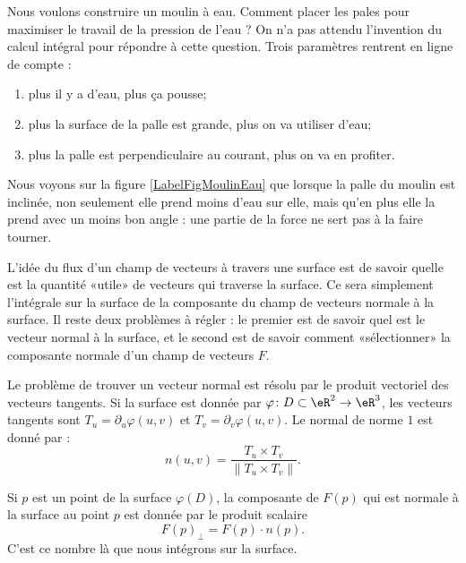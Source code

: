 Nous voulons construire un moulin à eau. Comment placer les pales pour maximiser le travail de la pression de l'eau ? On n'a pas attendu l'invention du calcul intégral pour répondre à cette question. Trois paramètres rentrent en ligne de compte :
\begin{enumerate}
    \item
        plus il y a d'eau, plus ça pousse;
    \item
        plus la surface de la palle est grande, plus on va utiliser d'eau;
    \item
        plus la palle est perpendiculaire au courant, plus on va en profiter.
\end{enumerate}
Nous voyons sur la figure \ref{LabelFigMoulinEau} que lorsque la palle du moulin est inclinée, non seulement elle prend moins d'eau sur elle, mais qu'en plus elle la prend avec un moins bon angle : une partie de la force ne sert pas à la faire tourner.
\newcommand{\CaptionFigMoulinEau}{La partie rouge de la force est perdue si l'eau ne pousse pas perpendiculairement. De plus lorsque la palle est inclinée, elle prend moins d'eau sur elle.}



L'idée du flux d'un champ de vecteurs à travers une surface est de savoir quelle est la quantité «utile» de vecteurs qui traverse la surface. Ce sera simplement l'intégrale sur la surface de la composante du champ de vecteurs normale à la surface. Il reste deux problèmes à régler : le premier est de savoir quel est le vecteur normal à la surface, et le second est de savoir comment «sélectionner» la composante normale d'un champ de vecteurs $F$.

Le problème de trouver un vecteur normal est résolu par le produit vectoriel des vecteurs tangents. Si la surface est donnée par $\varphi\colon D\subset\eR^2\to \eR^3$, les vecteurs tangents sont $T_u=\partial_u\varphi(u,v)$ et  $T_v=\partial_v\varphi(u,v)$. Le normal de norme $1$ est donné par :
\begin{equation}
    n(u,v)=\frac{ T_u\times T_v }{ \| T_u\times T_v \| }.
\end{equation}

Si $p$ est un point de la surface $\varphi(D)$, la composante de $F(p)$ qui est normale à la surface au point $p$ est donnée par le produit scalaire
\begin{equation}
    F(p)_{\perp}=F(p)\cdot n(p).
\end{equation}
C'est ce nombre là que nous intégrons sur la surface. 

